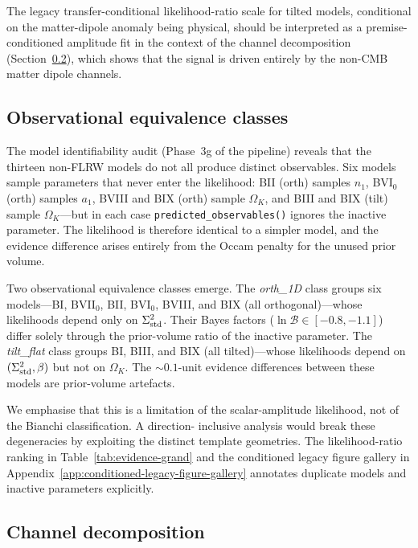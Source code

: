 The legacy transfer-conditional likelihood-ratio scale for tilted
models, conditional on the matter-dipole anomaly being physical,
should be interpreted as a premise-conditioned amplitude fit in
the context of the channel
decomposition (Section~\ref{sec:decomp}), which shows that the
signal is driven entirely by the non-CMB matter dipole channels.


\subsection{Observational equivalence classes}
\label{sec:equivalence}

The model identifiability audit
(Phase~3g of the pipeline) reveals that the thirteen non-FLRW
models do not all produce distinct observables.  Six models
sample parameters that never enter the likelihood: BII (orth)
samples $n_1$, BVI$_0$ (orth) samples $a_1$, BVIII and BIX
(orth) sample $\Omega_K$, and BIII and BIX (tilt) sample
$\Omega_K$---but in each case
\texttt{predicted\_observables()} ignores the inactive
parameter.  The likelihood is therefore identical to a simpler
model, and the evidence difference arises entirely from the
Occam penalty for the unused prior volume.

Two observational equivalence classes emerge.  The
\emph{orth\_1D} class groups six models---BI, BVII$_0$, BII,
BVI$_0$, BVIII, and BIX (all orthogonal)---whose likelihoods
depend only on $\Sigma^2_{\mathrm{std}}$.  Their Bayes factors ($\ln\mathcal{B}
\in [-0.8, -1.1]$) differ solely through the
prior-volume ratio of the inactive parameter.
The \emph{tilt\_flat} class groups BI, BIII, and BIX (all
tilted)---whose likelihoods depend on $(\Sigma^2_{\mathrm{std}}, \beta)$ but
not on $\Omega_K$.  The $\sim 0.1$-unit evidence
differences between these models are prior-volume artefacts.

We emphasise that this is a limitation of the scalar-amplitude
likelihood, not of the Bianchi classification.  A direction-
inclusive analysis would break these degeneracies by exploiting
the distinct template geometries.  The likelihood-ratio ranking in
Table~\ref{tab:evidence-grand} and
the conditioned legacy figure gallery in Appendix~\ref{app:conditioned-legacy-figure-gallery} annotates duplicate models
and inactive parameters explicitly.


\subsection{Channel decomposition}\label{sec:decomp}

